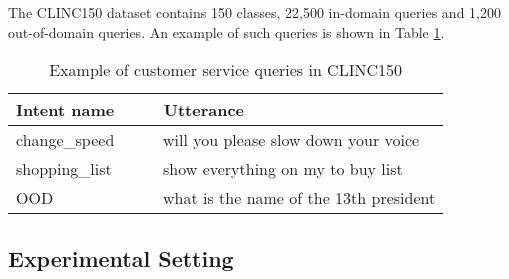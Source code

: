 \documentclass[runningheads]{llncs}
\begin{document}
The CLINC150 dataset contains 150 classes, 22,500 in-domain queries and 1,200 out-of-domain queries. 
An example of such queries is shown in Table \ref{tab:clinc150_example}.

\begin{table}[h]\centering
\caption{Example of customer service queries in CLINC150 \cite{larson2019evaluation_clinc_dataset}}
\label{tab:clinc150_example}
\begin{tabular}{l|l}
\textbf{Intent name} \,\,\,\, & \,\,\,\, \textbf{Utterance} \\ \hline
change\_speed \,\,\,\, & \,\,\,\,   will you please slow down your voice                \\
shopping\_list \,\,\,\, & \,\,\,\, show everything on my to buy list \\
OOD \,\,\,\, & \,\,\,\, what is the name of the 13th president       
\end{tabular}
\end{table}

\subsection{Experimental Setting}
\end{document}

